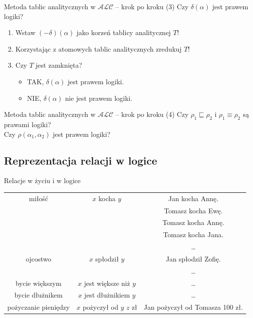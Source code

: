 \documentclass{beamer}
\begin{document}
\begin{frame}{Metoda tablic analitycznych w $\mathcal{ALC}$ -- krok po kroku (3)}
Czy $\delta(\alpha)$ jest prawem logiki?
%
\begin{enumerate}
\item Wstaw $(- \delta)(\alpha)$ jako korzeń tablicy analitycznej $T$!
%
\item Korzystając z atomowych tablic analitycznych zredukuj $T$!
%
\item Czy $T$ jest zamknięta?
%
\begin{itemize}
\item \textcolor[rgb]{0.00,1.00,0.00}{TAK}, $\delta(\alpha)$ \textcolor[rgb]{0.00,1.00,0.00}{jest} prawem logiki.
%
\item \textcolor[rgb]{1.00,0.00,0.00}{NIE}, $\delta(\alpha)$ \textcolor[rgb]{0.98,0.00,0.00}{nie jest} prawem logiki.
\end{itemize}
\end{enumerate}
\end{frame}

\begin{frame}{Metoda tablic analitycznych w $\mathcal{ALC}$ -- krok po kroku (4)}
%
Czy $\rho_{1} \sqsubseteq \rho_{2}$ i $\rho_{1} \equiv \rho_{2}$ są prawami logiki?\\
%
Czy $\rho(\alpha_{1},\alpha_{2})$ jest prawem logiki?
\end{frame}

\subsection{Reprezentacja relacji w logice}

\begin{frame}{Relacje w życiu i w logice}
%
\begin{center}
\begin{table}
{\scriptsize
\begin{tabular}{|c|c|c|}
\hline
miłość & $x$ kocha $y$ & Jan kocha Annę.\\
\cline{3-3}
& & Tomasz kocha Ewę.\\
\cline{3-3}
& & Tomasz kocha Annę.\\
\cline{3-3}
& & Tomasz kocha Jana. \\
\cline{3-3}
& & \dots \\
\hline
ojcostwo & $x$ spłodził $y$ & Jan spłodził Zofię.\\
\cline{3-3}
& & \dots \\
\hline
bycie większym & $x$ jest większe niż $y$ & \dots \\
\hline
bycie dłużnikem & $x$ jest dłużnikiem $y$ & \dots \\
\hline
pożyczanie pieniędzy & $x$ pożyczył od $y$ $z$ zł & Jan pożyczył od Tomasza 100 zł. \\
\hline
\end{tabular}
}
\end{table}
\end{center}
\end{frame}
\end{document}
